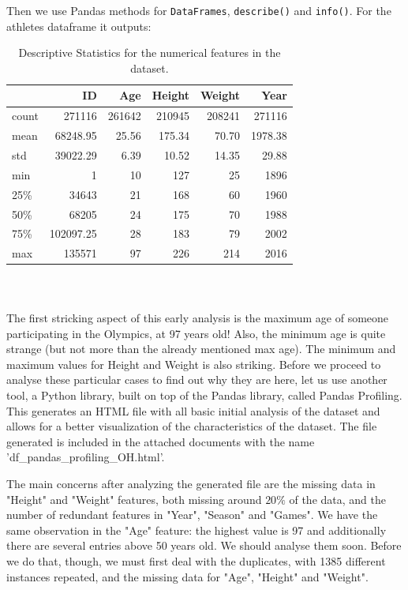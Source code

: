 \documentclass[11pt]{article} %
\begin{document}
Then we use Pandas methods for {\tt DataFrames}, {\tt describe()} and {\tt info()}. For the athletes dataframe it outputs:

\begin{table}[h]
\centering
\begin{tabular}{lrrrrr}
\toprule
{} &             ID &            Age &         Height &         Weight &           Year \\
\midrule
count &  271116 &  261642 &  210945 &  208241 &  271116 \\
mean  &   68248.95 &      25.56 &     175.34 &      70.70 &    1978.38 \\
std   &   39022.29 &       6.39 &      10.52 &      14.35 &      29.88 \\
min   &       1 &      10 &     127 &      25 &    1896 \\
25\%   &   34643 &      21 &     168 &      60 &    1960 \\
50\%   &   68205 &      24 &     175 &      70 &    1988 \\
75\%   &  102097.25 &      28 &     183 &      79 &    2002 \\
max   &  135571 &      97 &     226 &     214 &    2016 \\
\bottomrule
\end{tabular}
\caption{Descriptive Statistics for the numerical features in the dataset.}
\end{table}
\paragraph{\,}

The first stricking aspect of this early analysis is the maximum age of someone participating in the Olympics, at 97 years old! Also, the minimum age is quite strange (but not more than the already mentioned max age). The minimum and maximum values for Height and Weight is also striking. Before we proceed to analyse these particular cases to find out why they are here, let us use another tool, a Python library, built on top of the Pandas library, called Pandas Profiling. This generates an HTML file with all basic initial analysis of the dataset and allows for a better visualization of the characteristics of the dataset. The file generated is included in the attached documents with the name 'df\_pandas\_profiling\_OH.html'. 

The main concerns after analyzing the generated file are the missing data in "Height" and "Weight" features, both missing around $20\%$ of the data, and the number of redundant features in "Year", "Season" and "Games". We have the same observation in the "Age" feature: the highest value is 97 and additionally there are several entries above 50 years old. We should analyse them soon. Before we do that, though, we must first deal with the duplicates, with 1385 different instances repeated, and the missing data for "Age", "Height" and "Weight".
\end{document}

